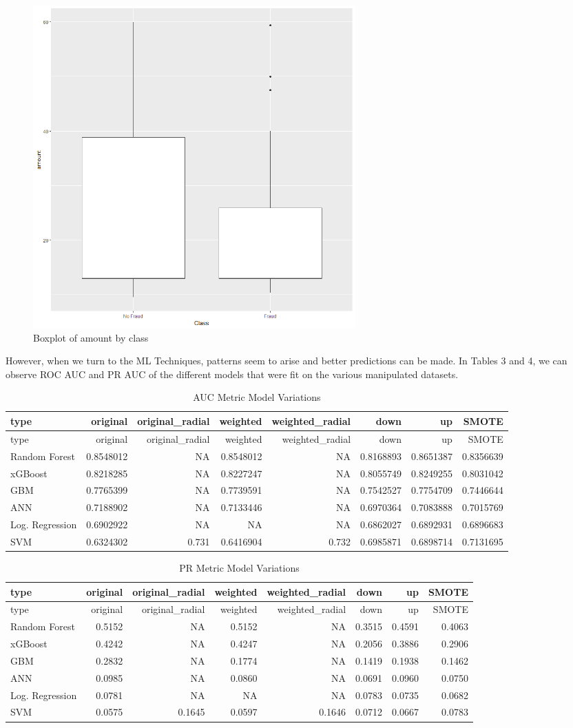 \documentclass[12pt,]{article}
\begin{document}
\begin{figure}
\centering
\includegraphics[width=0.6\textwidth,height=\textheight]{figures/ucsd/descriptive/boxplot_amount.png}
\caption{Boxplot of amount by class}
\end{figure}

However, when we turn to the ML Techniques, patterns seem to arise and
better predictions can be made. In Tables 3 and 4, we can observe ROC
AUC and PR AUC of the different models that were fit on the various
manipulated datasets.

\begin{longtable}[]{@{}lrrrrrrr@{}}
\caption{AUC Metric Model Variations}\tabularnewline
\toprule
type & original & original\_radial & weighted & weighted\_radial & down
& up & SMOTE\tabularnewline
\midrule
\endfirsthead
\toprule
type & original & original\_radial & weighted & weighted\_radial & down
& up & SMOTE\tabularnewline
\midrule
\endhead
Random Forest & 0.8548012 & NA & 0.8548012 & NA & 0.8168893 & 0.8651387
& 0.8356639\tabularnewline
xGBoost & 0.8218285 & NA & 0.8227247 & NA & 0.8055749 & 0.8249255 &
0.8031042\tabularnewline
GBM & 0.7765399 & NA & 0.7739591 & NA & 0.7542527 & 0.7754709 &
0.7446644\tabularnewline
ANN & 0.7188902 & NA & 0.7133446 & NA & 0.6970364 & 0.7083888 &
0.7015769\tabularnewline
Log. Regression & 0.6902922 & NA & NA & NA & 0.6862027 & 0.6892931 &
0.6896683\tabularnewline
SVM & 0.6324302 & 0.731 & 0.6416904 & 0.732 & 0.6985871 & 0.6898714 &
0.7131695\tabularnewline
\bottomrule
\end{longtable}

\begin{longtable}[]{@{}lrrrrrrr@{}}
\caption{PR Metric Model Variations}\tabularnewline
\toprule
type & original & original\_radial & weighted & weighted\_radial & down
& up & SMOTE\tabularnewline
\midrule
\endfirsthead
\toprule
type & original & original\_radial & weighted & weighted\_radial & down
& up & SMOTE\tabularnewline
\midrule
\endhead
Random Forest & 0.5152 & NA & 0.5152 & NA & 0.3515 & 0.4591 &
0.4063\tabularnewline
xGBoost & 0.4242 & NA & 0.4247 & NA & 0.2056 & 0.3886 &
0.2906\tabularnewline
GBM & 0.2832 & NA & 0.1774 & NA & 0.1419 & 0.1938 &
0.1462\tabularnewline
ANN & 0.0985 & NA & 0.0860 & NA & 0.0691 & 0.0960 &
0.0750\tabularnewline
Log. Regression & 0.0781 & NA & NA & NA & 0.0783 & 0.0735 &
0.0682\tabularnewline
SVM & 0.0575 & 0.1645 & 0.0597 & 0.1646 & 0.0712 & 0.0667 &
0.0783\tabularnewline
\bottomrule
\end{longtable}
\end{document}

